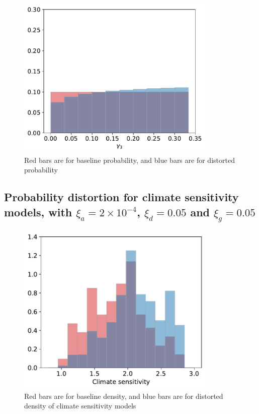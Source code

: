 \documentclass[12pt]{article}
\begin{document}
\begin{figure}[H]
	\centering
	\includegraphics[width=0.85\textwidth]{../figures/xi_comparison/20damage/Damage_distort.pdf}
	\caption{Red bars are for baseline probability, and blue bars are for distorted probability}
\end{figure}

\subsection{Probability distortion for climate sensitivity models, with $\xi_a = 2\times 10^{-4}$, $\xi_d = 0.05$ and $\xi_g = 0.05$}

\begin{figure}[H]
	\centering
	\includegraphics[width=0.85\textwidth]{../figures/xi_comparison/20damage/worstcase.pdf}
		\caption{Red bars are for baseline density, and blue bars are for distorted density of climate sensitivity models}
\end{figure}
\end{document}
